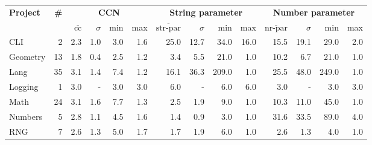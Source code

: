 \begin{tabular}{ l r | r@{\hskip 0.08in}r@{\hskip 0.08in}r@{\hskip 0.08in}r | r@{\hskip 0.08in}r@{\hskip 0.08in}r@{\hskip 0.08in}r | r@{\hskip 0.08in}r@{\hskip 0.08in}r@{\hskip 0.08in}r }
\hline 
\textbf{Project} & \textbf{\#} & \multicolumn{4}{c}{\textbf{CCN}} & \multicolumn{4}{c}{\textbf{String parameter}} & \multicolumn{4}{c}{\textbf{Number parameter}} \\ 
  &   & $\overline{\text{cc}}$ & $\sigma$ & min & max & $\overline{\text{str-par}}$ & $\sigma$ & min & max & $\overline{\text{nr-par}}$ & $\sigma$ & min & max \\ 
\hline 
CLI & 2 &2.3 &1.0 &3.0 & 1.6 &25.0 &12.7 &34.0 & 16.0 &15.5 &19.1 &29.0 & 2.0 \\ 
Geometry & 13 &1.8 &0.4 &2.5 & 1.2 &3.4 &5.5 &21.0 & 1.0 &10.2 &6.7 &21.0 & 1.0 \\ 
Lang & 35 &3.1 &1.4 &7.4 & 1.2 &16.1 &36.3 &209.0 & 1.0 &25.5 &48.0 &249.0 & 1.0 \\ 
Logging & 1 &3.0 &- &3.0 & 3.0 &6.0 &- &6.0 & 6.0 &3.0 &- &3.0 & 3.0 \\ 
Math & 24 &3.1 &1.6 &7.7 & 1.3 &2.5 &1.9 &9.0 & 1.0 &10.3 &11.0 &45.0 & 1.0 \\ 
Numbers & 5 &2.8 &1.1 &4.5 & 1.6 &1.4 &0.9 &3.0 & 1.0 &31.6 &33.5 &89.0 & 4.0 \\ 
RNG & 7 &2.6 &1.3 &5.0 & 1.7 &1.7 &1.9 &6.0 & 1.0 &2.6 &1.3 &4.0 & 1.0 \\ 
\hline 
\end{tabular}